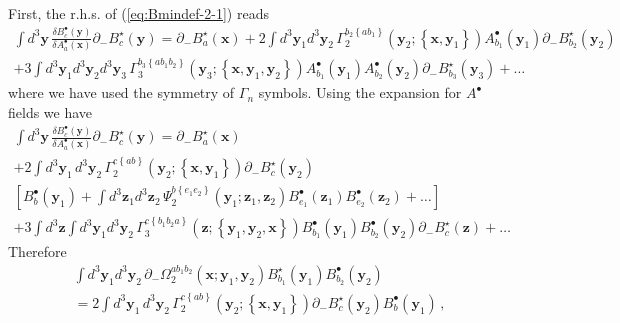 \documentclass[english,american]{article}
\begin{document}
First, the r.h.s. of (\ref{eq:Bmindef-2-1}) reads
\begin{multline}
\int d^{3}\mathbf{y}\,\frac{\delta B_{c}^{\bullet}\left(\mathbf{y}\right)}{\delta A_{a}^{\bullet}\left(\mathbf{x}\right)}\partial_{-}B_{c}^{\star}\left(\mathbf{y}\right)=\partial_{-}B_{a}^{\star}\left(\mathbf{x}\right)+2\int d^{3}\mathbf{y}_{1}d^{3}\mathbf{y}_{2}\,\Gamma_{2}^{b_{2}\left\{ ab_{1}\right\} }\left(\mathbf{y}_{2};\left\{ \mathbf{x},\mathbf{y}_{1}\right\} \right)A_{b_{1}}^{\bullet}\left(\mathbf{y}_{1}\right)\partial_{-}B_{b_{2}}^{\star}\left(\mathbf{y}_{2}\right)\\
+3\int d^{3}\mathbf{y}_{1}d^{3}\mathbf{y}_{2}d^{3}\mathbf{y}_{3}\,\Gamma_{3}^{b_{3}\left\{ ab_{1}b_{2}\right\} }\left(\mathbf{y}_{3};\left\{ \mathbf{x},\mathbf{y}_{1},\mathbf{y}_{2}\right\} \right)A_{b_{1}}^{\bullet}\left(\mathbf{y}_{1}\right)A_{b_{2}}^{\bullet}\left(\mathbf{y}_{2}\right)\partial_{-}B_{b_{3}}^{\star}\left(\mathbf{y}_{3}\right)+\dots
\end{multline}
where we have used the symmetry of $\Gamma_{n}$ symbols. Using the
expansion for $A^{\bullet}$ fields we have
\begin{multline}
\int d^{3}\mathbf{y}\,\frac{\delta B_{c}^{\bullet}\left(\mathbf{y}\right)}{\delta A_{a}^{\bullet}\left(\mathbf{x}\right)}\partial_{-}B_{c}^{\star}\left(\mathbf{y}\right)=\partial_{-}B_{a}^{\star}\left(\mathbf{x}\right)\\
+2\int d^{3}\mathbf{y}_{1}\, d^{3}\mathbf{y}_{2}\,\Gamma_{2}^{c\left\{ ab\right\} }\left(\mathbf{y}_{2};\left\{ \mathbf{x},\mathbf{y}_{1}\right\} \right)\partial_{-}B_{c}^{\star}\left(\mathbf{y}_{2}\right)\\
\left[B_{b}^{\bullet}\left(\mathbf{y}_{1}\right)+\int d^{3}\mathbf{z}_{1}d^{3}\mathbf{z}_{2}\,\Psi_{2}^{b\left\{ e_{1}e_{2}\right\} }\left(\mathbf{y}_{1};\mathbf{z}_{1},\mathbf{z}_{2}\right)B_{e_{1}}^{\bullet}\left(\mathbf{z}_{1}\right)B_{e_{2}}^{\bullet}\left(\mathbf{z}_{2}\right)+\dots\right]\\
+3\int d^{3}\mathbf{z}\int d^{3}\mathbf{y}_{1}d^{3}\mathbf{y}_{2}\,\Gamma_{3}^{c\left\{ b_{1}b_{2}a\right\} }\left(\mathbf{z};\left\{ \mathbf{y}_{1},\mathbf{y}_{2},\mathbf{x}\right\} \right)B_{b_{1}}^{\bullet}\left(\mathbf{y}_{1}\right)B_{b_{2}}^{\bullet}\left(\mathbf{y}_{2}\right)\partial_{-}B_{c}^{\star}\left(\mathbf{z}\right)+\dots
\end{multline}
Therefore
\begin{multline}
\int d^{3}\mathbf{y}_{1}d^{3}\mathbf{y}_{2}\,\partial_{-}\Omega_{2}^{ab_{1}b_{2}}\left(\mathbf{x};\mathbf{y}_{1},\mathbf{y}_{2}\right)B_{b_{1}}^{\star}\left(\mathbf{y}_{1}\right)B_{b_{2}}^{\bullet}\left(\mathbf{y}_{2}\right)\\
=2\int d^{3}\mathbf{y}_{1}\, d^{3}\mathbf{y}_{2}\,\Gamma_{2}^{c\left\{ ab\right\} }\left(\mathbf{y}_{2};\left\{ \mathbf{x},\mathbf{y}_{1}\right\} \right)\partial_{-}B_{c}^{\star}\left(\mathbf{y}_{2}\right)B_{b}^{\bullet}\left(\mathbf{y}_{1}\right)\,,
\end{multline}
\end{document}
